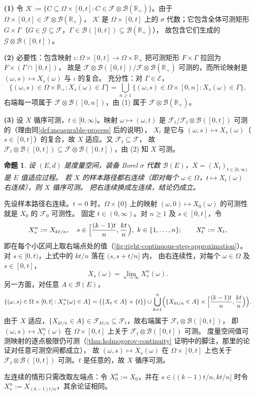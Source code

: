 \documentclass[UTF8,11pt,a4paper,oneside,fontset=fandol]{ctexrep}
\makeatletter
\numberwithin{equation}{section}
\theoremstyle{zhthm}
\newtheorem{proposition}[theorem]{命题}
\renewenvironment{proof}[1][\proofname]{\par
  \pushQED{\qed}%
  \normalfont\topsep6\p@\@plus6\p@\relax
  \trivlist
  \item[\hskip\labelsep\bfseries#1\hspace{0.5em}]\ignorespaces
}{%
  \popQED\endtrivlist\@endpefalse
}
\renewcommand{\proofname}{证明}
\newcommand{\R}{\mathbb{R}}
\newcommand{\B}{\mathcal{B}}
\newcommand{\F}{\mathcal{F}}
\newcommand{\G}{\mathcal{G}}
\makeatother
\begin{document}
\begin{proof}
\textbf{(1)} 令 $\mathcal K:=\{C\subseteq\Omega\times[0,t]:C\in\F\otimes\B(\R_+)\}$。由于 $\Omega\times[0,t]\in\F\otimes\B(\R_+)$，
$\mathcal K$ 是 $\Omega\times[0,t]$ 上的 $\sigma$ 代数；它包含全体可测矩形 $G\times\Gamma$（$G\in\G\subseteq\F$，$\Gamma\in\B([0,t])\subseteq\B(\R_+)$），
故包含它们生成的 $\G\otimes\B([0,t])$。

\textbf{(2)} 必要性：包含映射 $\iota:\Omega\times[0,t]\to\Omega\times\R_+$ 把可测矩形 $F\times\Gamma$ 拉回为 $F\times(\Gamma\cap[0,t])$，
故是 $\F\otimes\B([0,t])/\F\otimes\B(\R_+)$ 可测的\cite[定理 1.3.1]{Durrett2019}，而所论映射是 $(\omega,s)\mapsto X_s(\omega)$ 与 $\iota$ 的复合。
充分性：对 $\Gamma\in\mathcal E$，
\[
  \{(\omega,s)\in\Omega\times\R_+:X_s(\omega)\in\Gamma\}=\bigcup_{n\ge1}\{(\omega,s)\in\Omega\times[0,n]:X_s(\omega)\in\Gamma\},
\]
右端每一项属于 $\F\otimes\B([0,n])$，由 (1) 属于 $\F\otimes\B(\R_+)$。

\textbf{(3)} 设 $X$ 循序可测，$t\in[0,\infty)$。映射 $\omega\mapsto(\omega,t)$ 是 $\F_t/\F_t\otimes\B([0,t])$ 可测的（理由同\cref{def:measurable-process} 后的说明），
$X_t$ 是它与 $(\omega,s)\mapsto X_s(\omega)$（$s\in[0,t]$）的复合，故 $X$ 适应。又 $\F_t\subseteq\F$，
故 $\F_t\otimes\B([0,t])\subseteq\F\otimes\B([0,t])$，由 (2) 知 $X$ 可测。
\end{proof}

\begin{proposition}
\label{prop:right-continuous-progressive}
设 $(E,d)$ 是度量空间，装备 Borel $\sigma$ 代数 $\B(E)$，$X=(X_t)_{t\in[0,\infty)}$ 是 $E$ 值适应过程。
若 $X$ 的样本路径都右连续（即对每个 $\omega\in\Omega$，$t\mapsto X_t(\omega)$ 右连续），则 $X$ 循序可测。
把右连续换成左连续，结论仍成立。
\end{proposition}

\begin{proof}
先设样本路径右连续。$t=0$ 时，$\Omega\times\{0\}$ 上的映射 $(\omega,0)\mapsto X_0(\omega)$ 的可测性就是 $X_0$ 的 $\F_0$ 可测性。
固定 $t\in(0,\infty)$。对 $n\ge1$ 及 $s\in[0,t]$，令
\[
  X^n_s:=X_{kt/n},\quad s\in\Bigl[\frac{(k-1)t}{n},\frac{kt}{n}\Bigr),\ k\in\{1,\ldots,n\};\qquad X^n_t:=X_t,
\]
即在每个小区间上取右端点处的值（\cref{fig:right-continuous-step-approximation}）。对 $s\in[0,t)$，上式中的 $kt/n$ 落在 $(s,s+t/n]$ 内，
由右连续性，对每个 $\omega\in\Omega$ 及 $s\in[0,t]$，
\[
  X_s(\omega)=\lim_{n\to\infty}X^n_s(\omega).
\]
另一方面，对任意 $A\in\B(E)$，
\[
  \{(\omega,s)\in\Omega\times[0,t]:X^n_s(\omega)\in A\}
  =\bigl(\{X_t\in A\}\times\{t\}\bigr)\cup\bigcup_{k=1}^{n}\Bigl(\{X_{kt/n}\in A\}\times\Bigl[\frac{(k-1)t}{n},\frac{kt}{n}\Bigr)\Bigr).
\]
由于 $X$ 适应，$\{X_{kt/n}\in A\}\in\F_{kt/n}\subseteq\F_t$，故右端属于 $\F_t\otimes\B([0,t])$，
即 $(\omega,s)\mapsto X^n_s(\omega)$ 在 $\Omega\times[0,t]$ 上关于 $\F_t\otimes\B([0,t])$ 可测。
度量空间值可测映射的逐点极限仍可测（\cref{thm:kolmogorov-continuity} 证明中的脚注，那里的论证对任意可测空间都成立），
故 $(\omega,s)\mapsto X_s(\omega)$ 在 $\Omega\times[0,t]$ 上也关于 $\F_t\otimes\B([0,t])$ 可测。$t$ 是任意的，故 $X$ 循序可测。

左连续的情形只需改取左端点：令 $X^n_0:=X_0$，并在 $s\in\bigl((k-1)t/n,kt/n\bigr]$ 时令 $X^n_s:=X_{(k-1)t/n}$，其余论证相同。
\end{proof}
\end{document}
